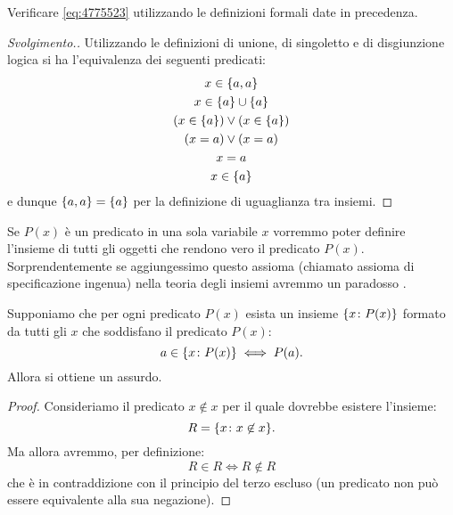 \begin{exercise}
  Verificare \eqref{eq:4775523} utilizzando le definizioni formali date in precedenza.
\end{exercise}
\begin{proof}[Svolgimento.]
Utilizzando le definizioni di unione, di singoletto e di disgiunzione logica
si ha l'equivalenza dei seguenti
predicati:
\begin{gather*}
  x \in {\left\{ a,a \right\}}  \\
  x \in {\left\{ a \right\}} \cup {\left\{ a \right\}}\\
  (x \in {\left\{ a \right\}}) \lor (x \in {\left\{ a \right\}})\\
  (x = a) \lor (x = a) \\
  x = a \\
  x \in {\left\{ a \right\}}
\end{gather*}
e dunque ${\left\{ a,a \right\}}={\left\{ a \right\}}$ per la definizione di uguaglianza tra insiemi.
\end{proof}

Se $P(x)$ è un predicato in una sola variabile $x$ vorremmo poter
definire l'insieme di tutti gli oggetti che rendono vero il predicato $P(x)$.
Sorprendentemente se aggiungessimo questo assioma 
(chiamato assioma di specificazione ingenua) nella teoria degli insiemi
avremmo un paradosso%
%
%
%
%
%
.

\begin{theorem}
\label{th:Russell}%
Supponiamo che per ogni predicato $P(x)$ esista un insieme 
${\left\{ x\colon P(x) \right\}}$ formato da tutti gli $x$ 
che soddisfano il predicato $P(x)$:
\[
  a \in {\left\{ x\colon P(x) \right\}} \iff P(a).
\]
Allora si ottiene un assurdo.
\end{theorem}
%
\begin{proof}
  Consideriamo il predicato $x \not \in x$
  per il quale dovrebbe esistere l'insieme:
  \[
    R = {\left\{ x\colon x\not \in x \right\}}.  
  \]
  Ma allora avremmo, per definizione:
  \[
    R \in R 
    \iff R\not \in R
  \]
  che è in contraddizione con il principio del terzo escluso
  (un predicato non può essere equivalente alla sua negazione).
\end{proof}

